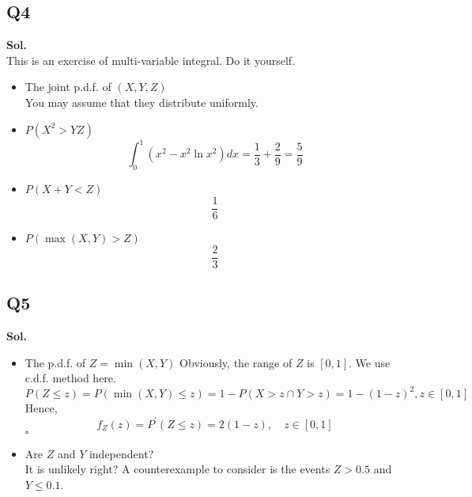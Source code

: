 \documentclass[12pt]{article}
\begin{document}
\subsection*{Q4}
\textbf{Sol.}\\ 
   This is an exercise of multi-variable integral. Do it yourself. 
\begin{itemize}
    \item The joint p.d.f. of \((X,Y,Z)\) \\
    You may assume that they distribute uniformly. 
    \item \(P(X^{2}  > YZ)\)
    \[
      \int_0^1 (x^2 - x^2\ln{x^2}) dx =  \frac{1}{3} + \frac{2}{9} = \frac{5}{9}
    \]
    \item \(P(X+Y < Z)\)
    \[
      \frac{1}{6}
    \]
    \item \(P(\max{(X,Y)} > Z)\)   
    \[
      \frac{2}{3}
    \]
\end{itemize}

\subsection*{Q5}
\textbf{Sol.}\\ 
\begin{itemize}
    \item The p.d.f. of \(Z = \min{(X,Y)}\) 
    Obviously, the range of \(Z\) is \([0,1]\).
    We use c.d.f. method here. 
    \[
      P(Z \leq z) = P(\min{(X,Y)} \leq z) = 1 - P(X > z \cap Y > z) = 1 - (1-z)^2, z \in [0,1]
    \]
    Hence, 
    \[
      f_Z(z) = P^\prime(Z \leq z) = 2(1-z), \quad z \in [0,1]
    \]
    \hspace{\textwidth} \(\square\) 
    \item Are \(Z\) and \(Y\) independent?\\ 
    It is unlikely right? A counterexample to consider is the events \(Z > 0.5\) and \(Y \leq 0.1\).  
\end{itemize}
\end{document}
